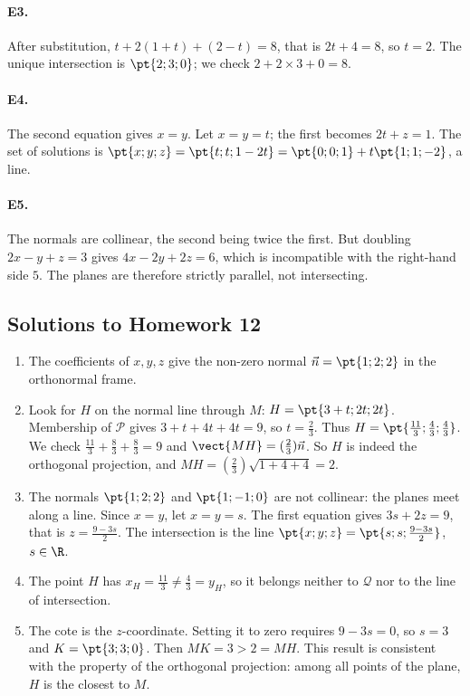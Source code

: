 \paragraph{E3.}After substitution, $t+2(1+t)+(2-t)=8$, that is $2t+4=8$, so $t=2$. The unique intersection is $\pt{2;3;0}$; we check $2+2\times3+0=8$.

\paragraph{E4.}The second equation gives $x=y$. Let $x=y=t$; the first becomes $2t+z=1$. The set of solutions is $\pt{x;y;z}=\pt{t;t;1-2t}=\pt{0;0;1}+t\pt{1;1;-2}$, a line.

\paragraph{E5.}The normals are collinear, the second being twice the first. But doubling $2x-y+z=3$ gives $4x-2y+2z=6$, which is incompatible with the right-hand side $5$. The planes are therefore strictly parallel, not intersecting.


\subsection{Solutions to Homework 12}\begin{enumerate}
\item The coefficients of $x,y,z$ give the non-zero normal $\vec n=\pt{1;2;2}$ in the orthonormal frame.
\item Look for $H$ on the normal line through $M$: $H=\pt{3+t;2t;2t}$. Membership of $\mathcal P$ gives $3+t+4t+4t=9$, so $t=\frac{2}{3}$. Thus $H=\pt{\frac{11}{3};\frac{4}{3};\frac{4}{3}}$. We check $\frac{11}{3}+\frac{8}{3}+\frac{8}{3}=9$ and $\vect{MH}=(\frac{2}{3})\vec{n}$. So $H$ is indeed the orthogonal projection, and $MH=(\frac{2}{3})\sqrt{1+4+4}=2$.
\item The normals $\pt{1;2;2}$ and $\pt{1;-1;0}$ are not collinear: the planes meet along a line. Since $x=y$, let $x=y=s$. The first equation gives $3s+2z=9$, that is $z=\frac{9-3s}{2}$. The intersection is the line $\pt{x;y;z}=\pt{s;s;\frac{9-3s}{2}}$, $s\in\R$.
\item The point $H$ has $x_H=\frac{11}{3}\ne\frac{4}{3}=y_H$, so it belongs neither to $\mathcal Q$ nor to the line of intersection.
\item The cote is the $z$-coordinate. Setting it to zero requires $9-3s=0$, so $s=3$ and $K=\pt{3;3;0}$. Then $MK=3>2=MH$. This result is consistent with the property of the orthogonal projection: among all points of the plane, $H$ is the closest to $M$.
\end{enumerate}

